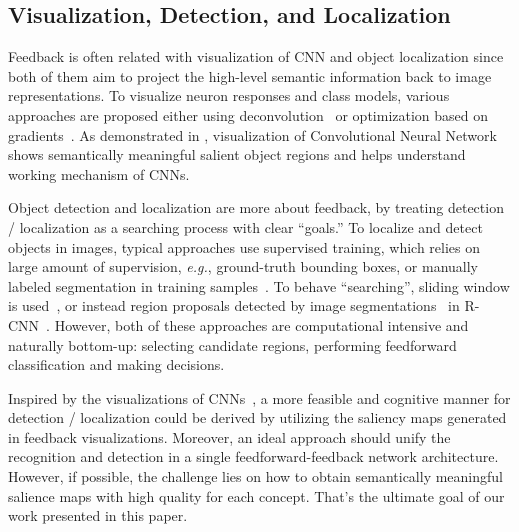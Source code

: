 \subsection{Visualization, Detection, and Localization}

Feedback is often related with visualization of CNN and object localization since both of them aim to project the high-level semantic information back to image representations. To visualize neuron responses and class models, various approaches are proposed either using deconvolution~\cite{zeiler2014visualizing} or optimization based on gradients~\cite{simonyan2013deep, le2013building}. As demonstrated in \cite{simonyan2013deep}, visualization of Convolutional Neural Network shows semantically meaningful salient object regions and helps understand working mechanism of CNNs.

Object detection and localization are more about feedback, by treating detection / localization as a searching process with clear ``goals.'' To localize and detect objects in images, typical approaches use supervised training, which relies on large amount of supervision, \emph{e.g.}, ground-truth bounding boxes, or manually labeled segmentation in training samples~\cite{erhan2014scalable}. To behave ``searching'', sliding window is used~\cite{erhan2014scalable}, or instead region proposals detected by image segmentations~\cite{uijlings2013selective} in R-CNN~\cite{girshick2014rich}. However, both of these approaches are computational intensive and naturally bottom-up: selecting candidate regions, performing feedforward classification and making decisions.

Inspired by the visualizations of CNNs~\cite{zeiler2014visualizing,simonyan2013deep}, a more feasible and cognitive manner for detection / localization could be derived by utilizing the saliency maps generated in feedback visualizations. Moreover, an ideal approach should unify the recognition and detection in a single feedforward-feedback network architecture. However, if possible, the challenge lies on how to obtain semantically meaningful salience maps with high quality for each concept. That's the ultimate goal of our work presented in this paper.

